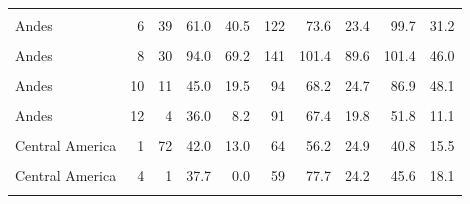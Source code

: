 \begin{ThreePartTable}
\begin{longtable}[t]{lrrrrrrrrr}
\cellcolor{gray!6}{Andes} & \cellcolor{gray!6}{5} & \cellcolor{gray!6}{68} & \cellcolor{gray!6}{69.0} & \cellcolor{gray!6}{59.8} & \cellcolor{gray!6}{114} & \cellcolor{gray!6}{78.7} & \cellcolor{gray!6}{16.1} & \cellcolor{gray!6}{114.3} & \cellcolor{gray!6}{41.2}\\
Andes & 6 & 39 & 61.0 & 40.5 & 122 & 73.6 & 23.4 & 99.7 & 31.2\\
\cellcolor{gray!6}{Andes} & \cellcolor{gray!6}{7} & \cellcolor{gray!6}{23} & \cellcolor{gray!6}{81.0} & \cellcolor{gray!6}{112.0} & \cellcolor{gray!6}{120} & \cellcolor{gray!6}{77.3} & \cellcolor{gray!6}{40.3} & \cellcolor{gray!6}{94.0} & \cellcolor{gray!6}{67.7}\\
Andes & 8 & 30 & 94.0 & 69.2 & 141 & 101.4 & 89.6 & 101.4 & 46.0\\
\cellcolor{gray!6}{Andes} & \cellcolor{gray!6}{9} & \cellcolor{gray!6}{45} & \cellcolor{gray!6}{61.0} & \cellcolor{gray!6}{57.0} & \cellcolor{gray!6}{130} & \cellcolor{gray!6}{74.6} & \cellcolor{gray!6}{56.3} & \cellcolor{gray!6}{89.3} & \cellcolor{gray!6}{58.2}\\
Andes & 10 & 11 & 45.0 & 19.5 & 94 & 68.2 & 24.7 & 86.9 & 48.1\\
\cellcolor{gray!6}{Andes} & \cellcolor{gray!6}{11} & \cellcolor{gray!6}{4} & \cellcolor{gray!6}{41.9} & \cellcolor{gray!6}{8.3} & \cellcolor{gray!6}{88} & \cellcolor{gray!6}{69.8} & \cellcolor{gray!6}{19.2} & \cellcolor{gray!6}{39.6} & \cellcolor{gray!6}{6.5}\\
Andes & 12 & 4 & 36.0 & 8.2 & 91 & 67.4 & 19.8 & 51.8 & 11.1\\
\cellcolor{gray!6}{Andes} & \cellcolor{gray!6}{13} & \cellcolor{gray!6}{36} & \cellcolor{gray!6}{71.0} & \cellcolor{gray!6}{7.0} & \cellcolor{gray!6}{88} & \cellcolor{gray!6}{74.0} & \cellcolor{gray!6}{21.2} & \cellcolor{gray!6}{101.4} & \cellcolor{gray!6}{59.9}\\
Central America & 1 & 72 & 42.0 & 13.0 & 64 & 56.2 & 24.9 & 40.8 & 15.5\\
\cellcolor{gray!6}{Central America} & \cellcolor{gray!6}{2} & \cellcolor{gray!6}{2} & \cellcolor{gray!6}{50.2} & \cellcolor{gray!6}{4.1} & \cellcolor{gray!6}{41} & \cellcolor{gray!6}{76.7} & \cellcolor{gray!6}{22.6} & \cellcolor{gray!6}{35.7} & \cellcolor{gray!6}{21.9}\\
Central America & 4 & 1 & 37.7 & 0.0 & 59 & 77.7 & 24.2 & 45.6 & 18.1\\
\cellcolor{gray!6}{Central America} & \cellcolor{gray!6}{5} & \cellcolor{gray!6}{41} & \cellcolor{gray!6}{34.7} & \cellcolor{gray!6}{6.6} & \cellcolor{gray!6}{39} & \cellcolor{gray!6}{82.6} & \cellcolor{gray!6}{25.7} & \cellcolor{gray!6}{40.9} & \cellcolor{gray!6}{12.3}\\

\end{longtable}
\end{ThreePartTable}
